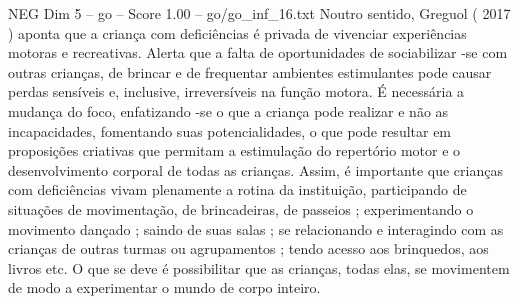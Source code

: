 \begin{textsample}{NEG Dim 5 – go – Score 1.00 – go/go\_inf\_16.txt}
Noutro sentido, Greguol ( 2017 ) aponta que a criança com deficiências é privada de vivenciar experiências motoras e recreativas.
Alerta que a falta de oportunidades de sociabilizar -se com outras crianças, de brincar e de frequentar ambientes estimulantes pode causar perdas sensíveis e, inclusive, irreversíveis na função motora.
É necessária a mudança do foco, enfatizando -se o que a criança pode realizar e não as incapacidades, fomentando suas potencialidades, o que pode resultar em proposições criativas que permitam a estimulação do repertório motor e o desenvolvimento corporal de todas as crianças.
Assim, é importante que crianças com deficiências vivam plenamente a rotina da instituição, participando de situações de movimentação, de brincadeiras, de passeios ; experimentando o movimento dançado ; saindo de suas salas ; se relacionando e interagindo com as crianças de outras turmas ou agrupamentos ; tendo acesso aos brinquedos, aos livros etc.
O que se deve é possibilitar que as crianças, todas elas, se movimentem de modo a experimentar o mundo de corpo inteiro.

\end{textsample}
